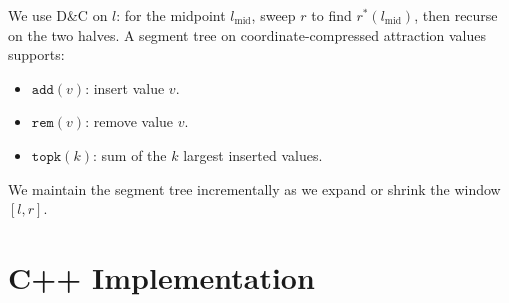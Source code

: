 \documentclass[11pt,a4paper]{article}
\begin{document}
We use D\&C on $l$: for the midpoint $l_{\text{mid}}$, sweep $r$ to find $r^*(l_{\text{mid}})$, then recurse on the two halves. A segment tree on coordinate-compressed attraction values supports:
\begin{itemize}
  \item $\texttt{add}(v)$: insert value $v$.
  \item $\texttt{rem}(v)$: remove value $v$.
  \item $\texttt{topk}(k)$: sum of the $k$ largest inserted values.
\end{itemize}

We maintain the segment tree incrementally as we expand or shrink the window $[l, r]$.

\section{C++ Implementation}
\end{document}
